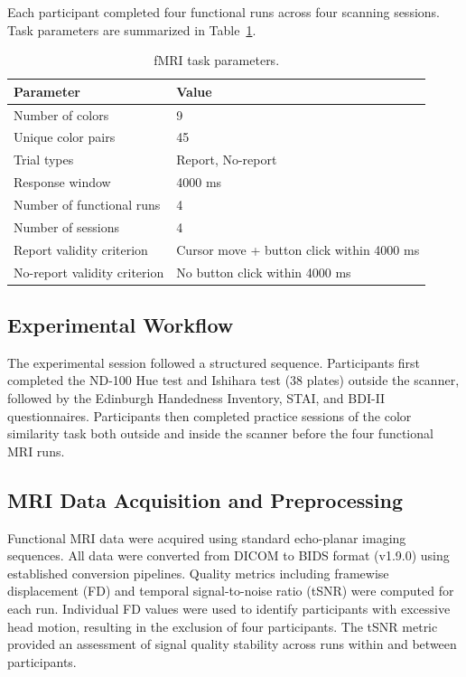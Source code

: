\documentclass[11pt]{article}
\begin{document}
Each participant completed four functional runs across four scanning sessions. Task parameters are summarized in Table~\ref{tab:taskparams}.

\begin{table}[htbp]
\centering
\caption{fMRI task parameters.}
\label{tab:taskparams}
\begin{tabular}{ll}
\toprule
Parameter & Value \\
\midrule
Number of colors & 9 \\
Unique color pairs & 45 \\
Trial types & Report, No-report \\
Response window & 4000 ms \\
Number of functional runs & 4 \\
Number of sessions & 4 \\
Report validity criterion & Cursor move + button click within 4000 ms \\
No-report validity criterion & No button click within 4000 ms \\
\bottomrule
\end{tabular}
\end{table}

\subsection{Experimental Workflow}

The experimental session followed a structured sequence. Participants first completed the ND-100 Hue test and Ishihara test (38 plates) outside the scanner, followed by the Edinburgh Handedness Inventory, STAI, and BDI-II questionnaires. Participants then completed practice sessions of the color similarity task both outside and inside the scanner before the four functional MRI runs.

\subsection{MRI Data Acquisition and Preprocessing}

Functional MRI data were acquired using standard echo-planar imaging sequences. All data were converted from DICOM to BIDS format (v1.9.0) using established conversion pipelines. Quality metrics including framewise displacement (FD) and temporal signal-to-noise ratio (tSNR) were computed for each run. Individual FD values were used to identify participants with excessive head motion, resulting in the exclusion of four participants. The tSNR metric provided an assessment of signal quality stability across runs within and between participants.
\end{document}
